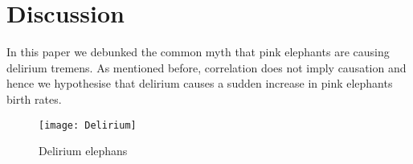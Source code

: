 \section{Discussion}
\label{sec:Discussion}
In this paper we debunked the common myth that pink elephants are causing delirium tremens. As mentioned before, correlation does not imply causation and hence we hypothesise that delirium causes a sudden increase in pink elephants birth rates.
\begin{figure}[h]
	\centering
	\texttt{[image: Delirium]}
	\caption{Delirium elephans}
	\label{fig:ElephantTremens}
\end{figure}
